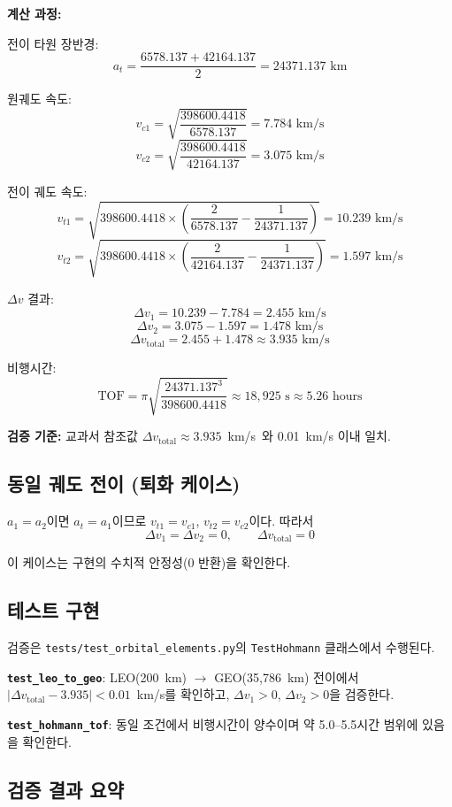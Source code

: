 \documentclass[11pt]{article}
\begin{document}
\textbf{계산 과정:}

전이 타원 장반경:
\[
a_t = \frac{6578.137 + 42164.137}{2} = 24371.137 \text{~km}
\]

원궤도 속도:
\[
v_{c1} = \sqrt{\frac{398600.4418}{6578.137}} = 7.784 \text{~km/s}
\]
\[
v_{c2} = \sqrt{\frac{398600.4418}{42164.137}} = 3.075 \text{~km/s}
\]

전이 궤도 속도:
\[
v_{t1} = \sqrt{398600.4418 \times \left(\frac{2}{6578.137} - \frac{1}{24371.137}\right)} = 10.239 \text{~km/s}
\]
\[
v_{t2} = \sqrt{398600.4418 \times \left(\frac{2}{42164.137} - \frac{1}{24371.137}\right)} = 1.597 \text{~km/s}
\]

$\Delta v$ 결과:
\[
\Delta v_1 = 10.239 - 7.784 = 2.455 \text{~km/s}
\]
\[
\Delta v_2 = 3.075 - 1.597 = 1.478 \text{~km/s}
\]
\[
\Delta v_{\text{total}} = 2.455 + 1.478 \approx 3.935 \text{~km/s}
\]

비행시간:
\[
\text{TOF} = \pi\sqrt{\frac{24371.137^3}{398600.4418}} \approx 18{,}925 \text{~s} \approx 5.26 \text{~hours}
\]

\textbf{검증 기준:} 교과서 참조값 $\Delta v_{\text{total}} \approx 3.935$~km/s~\cite{Curtis2020}와 0.01~km/s 이내 일치.

\subsection{동일 궤도 전이 (퇴화 케이스)}

$a_1 = a_2$이면 $a_t = a_1$이므로 $v_{t1} = v_{c1}$, $v_{t2} = v_{c2}$이다. 따라서
\[
\Delta v_1 = \Delta v_2 = 0, \qquad \Delta v_{\text{total}} = 0
\]

이 케이스는 구현의 수치적 안정성(0 반환)을 확인한다.

\subsection{테스트 구현}

검증은 \texttt{tests/test\_orbital\_elements.py}의 \texttt{TestHohmann} 클래스에서 수행된다.

\textbf{\texttt{test\_leo\_to\_geo}}: LEO(200~km) $\rightarrow$ GEO(35,786~km) 전이에서 $|\Delta v_{\text{total}} - 3.935| < 0.01$~km/s를 확인하고, $\Delta v_1 > 0$, $\Delta v_2 > 0$을 검증한다.

\textbf{\texttt{test\_hohmann\_tof}}: 동일 조건에서 비행시간이 양수이며 약 5.0--5.5시간 범위에 있음을 확인한다.

\subsection{검증 결과 요약}
\end{document}
